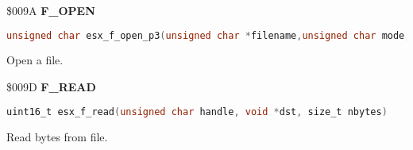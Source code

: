 \$009A \textbf{F\_OPEN}

\begin{lstlisting}[language=C]
unsigned char esx_f_open_p3(unsigned char *filename,unsigned char mode,struct esx_p3_hdr *h)
\end{lstlisting}

Open a file.

%

\$009D \textbf{F\_READ}

\begin{lstlisting}[language=C]
uint16_t esx_f_read(unsigned char handle, void *dst, size_t nbytes)
\end{lstlisting}

Read bytes from file.

%

